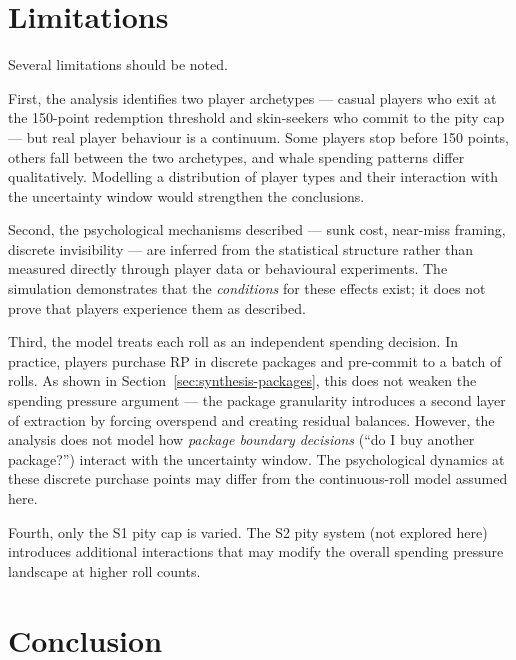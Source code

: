 \documentclass[11pt, a4paper]{article}
\begin{document}
\section{Limitations}
\label{sec:limitations}

Several limitations should be noted.

First, the analysis identifies two player archetypes --- casual
players who exit at the 150-point redemption threshold and
skin-seekers who commit to the pity cap --- but real player
behaviour is a continuum. Some players stop before 150 points,
others fall between the two archetypes, and whale spending
patterns differ qualitatively. Modelling a distribution of player
types and their interaction with the uncertainty window would
strengthen the conclusions.

Second, the psychological mechanisms described --- sunk cost,
near-miss framing, discrete invisibility --- are inferred from the
statistical structure rather than measured directly through player
data or behavioural experiments. The simulation demonstrates that
the \emph{conditions} for these effects exist; it does not prove
that players experience them as described.

Third, the model treats each roll as an independent spending
decision. In practice, players purchase RP in discrete packages and
pre-commit to a batch of rolls. As shown in
Section~\ref{sec:synthesis-packages}, this does not weaken the
spending pressure argument --- the package granularity introduces a
second layer of extraction by forcing overspend and creating
residual balances. However, the analysis does not model how
\emph{package boundary decisions} (``do I buy another package?'')
interact with the uncertainty window. The psychological dynamics at
these discrete purchase points may differ from the continuous-roll
model assumed here.

Fourth, only the S1 pity cap is varied. The S2 pity system (not
explored here) introduces additional interactions that may modify the
overall spending pressure landscape at higher roll counts.


\section{Conclusion}
\label{sec:conclusion}
\end{document}
